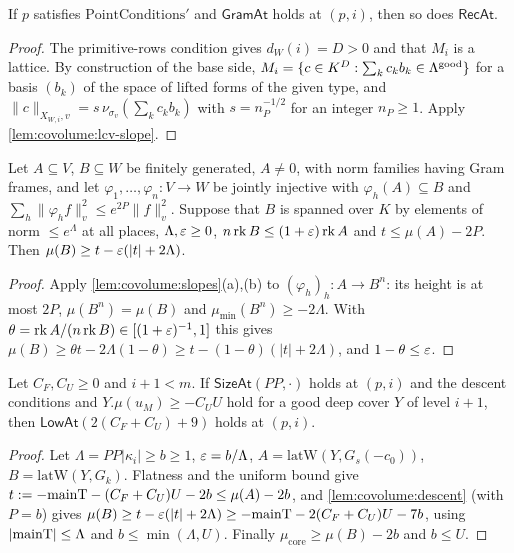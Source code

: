 \begin{lemma}\label{lem:covolume:rec}
If $p$ satisfies $\mathrm{PointConditions}'$ and $\mathsf{GramAt}$ holds at $(p,i)$, then so does
$\mathsf{RecAt}$.
\end{lemma}

\begin{proof}
The primitive-rows condition gives $d_W(i)=D>0$ and that $M_i$ is a lattice. By construction of the
base side, $M_i=\{c\in K^D:\sum_kc_kb_k\in\Lambda^{\mathrm{good}}\}$ for a basis $(b_k)$ of the space of lifted
forms of the given type, and $\|c\|_{X_{W,i},v}=s\,\nu_{\sigma_v}(\sum_kc_kb_k)$ with $s=n_P^{-1/2}$ for an
integer $n_P\ge1$. Apply \cref{lem:covolume:lcv-slope}.
\end{proof}

\begin{lemma}[Descent]\label{lem:covolume:descent}
Let $A\subseteq V$, $B\subseteq W$ be finitely generated, $A\ne0$, with norm families having Gram
frames, and let $\varphi_1,\dots,\varphi_n\colon V\to W$ be jointly injective with
$\varphi_h(A)\subseteq B$ and $\sum_h\|\varphi_hf\|_v^2\le e^{2P}\|f\|_v^2$. Suppose that $B$ is spanned
over $K$ by elements of norm $\le e^\Lambda$ at all places, $\Lambda,\varepsilon\ge0$,
$n\operatorname{rk} B\le(1+\varepsilon)\operatorname{rk} A$ and $t\le\mu(A)-2P$. Then $\mu(B)\ge t-\varepsilon(|t|+2\Lambda)$.
\end{lemma}

\begin{proof}
Apply \cref{lem:covolume:slopes}(a),(b) to $(\varphi_h)_h\colon A\to B^n$: its height is at most $2P$,
$\mu(B^n)=\mu(B)$ and $\mu_{\min}(B^n)\ge-2\Lambda$. With
$\theta=\operatorname{rk} A/(n\operatorname{rk} B)\in[(1+\varepsilon)^{-1},1]$ this gives
$\mu(B)\ge\theta t-2\Lambda(1-\theta)\ge t-(1-\theta)(|t|+2\Lambda)$, and $1-\theta\le\varepsilon$.
\end{proof}

\begin{lemma}\label{lem:covolume:low}
Let $C_F,C_U\ge0$ and $i+1<m$. If $\mathsf{SizeAt}(PP,\cdot)$ holds at $(p,i)$ and the descent
conditions and $Y.\mu(u_M)\ge-C_UU$ hold for a good deep cover $Y$ of level $i+1$, then
$\mathsf{LowAt}(2(C_F+C_U)+9)$ holds at $(p,i)$.
\end{lemma}

\begin{proof}
Let $\Lambda=PP|\kappa_i|\ge b\ge1$, $\varepsilon=b/\Lambda$, $A=\mathrm{latW}(Y,G_s(-c_0))$,
$B=\mathrm{latW}(Y,G_k)$. Flatness and the uniform bound give
$t:=-\mathrm{mainT}-(C_F+C_U)U-2b\le\mu(A)-2b$, and \cref{lem:covolume:descent} (with $P=b$) gives
$\mu(B)\ge t-\varepsilon(|t|+2\Lambda)\ge-\mathrm{mainT}-2(C_F+C_U)U-7b$, using $|\mathrm{mainT}|\le\Lambda$
and $b\le\min(\Lambda,U)$. Finally $\mu_{\mathrm{core}}\ge\mu(B)-2b$ and $b\le U$.
\end{proof}

